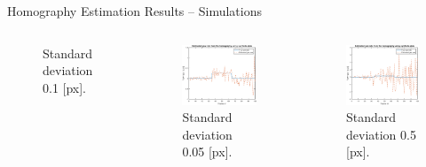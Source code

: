 \documentclass{beamer}
\begin{document}
\begin{frame}{Homography Estimation Results -- Simulations}
\begin{columns}[T]
\begin{figure}
		\vspace{-1.25em}
		\caption{Standard deviation 0.1 [px].}
	\end{figure}
	\begin{figure}
		\includegraphics[height=0.375\textheight]{Hom/rect_5e-2}
		\vspace{-1.25em}
		\caption{Standard deviation 0.05 [px].}
	\end{figure}
	\vspace{-2.5em}
	\begin{figure}
		\includegraphics[height=0.375\textheight]{Hom/rect_5e-1}
		\vspace{-1.25em}
		\caption{Standard deviation 0.5 [px].}
	\end{figure}
	\end{columns}
\end{frame}
\end{document}
